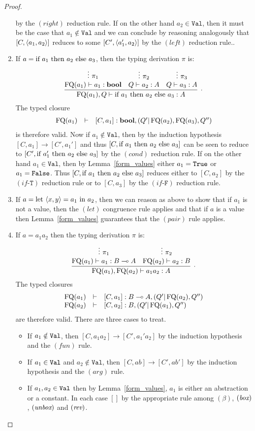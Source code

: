 \documentclass[twoside]{article}
\begin{document}
\begin{proof}
\begin{enumerate}
  by the $(right)$ reduction rule.
  If on the other hand $a_2\in\mathtt{Val}$, then it must be the case that $a_1\notin\mathtt{Val}$ 
  and we can conclude by reasoning analogously that $[C,\langle a_1,a_2\rangle]$ reduces to 
  some $[C',\langle a_1',a_2\rangle]$ by the $(left)$ reduction rule.. 
  \item If $a=\text{if}~ a_1 ~\text{then}~ a_2 ~\text{else}~ a_3$, then the typing derivation $\pi$ is:
  \[
  \infer[.]{\FQ(a_1),Q\entails \ifthenelse{a_1}{a_2}{a_3}:A}{
    \deduce[]{\FQ(a_1)\entails a_1:\bool }{
      \vdots~\pi_1
    }
    &
    \deduce[]{Q \entails a_2:A}{
      \vdots~\pi_2
    }    
    &
    \deduce[]{Q \entails a_3:A}{
      \vdots~\pi_3
    }    
  }
  \]  
  The typed closure
  \[
  \begin{array}{rcl}
  \mathop{\textrm{FQ}}\nolimits(a_1) & \vdash & [C,a_1]:\textrm{\bf bool},(Q'|\mathop{\textrm{FQ}}\nolimits(a_2),\mathop{\textrm{FQ}}\nolimits(a_3),Q'')
  \end{array}
  \]
  is therefore valid. Now if $a_1\notin\mathtt{Val}$, then by the induction hypothesis 
  $[C,a_1]\to[C',a_1']$ and thus $[C,\text{if}~ a_1 ~\text{then}~ a_2 ~\text{else}~ a_3]$ can
  be seen to reduce
  to $[C',\text{if}~ a_1' ~\text{then}~ a_2 ~\text{else}~ a_3]$ by the $(cond)$ reduction rule. 
  If on the other hand $a_1\in\mathtt{Val}$, then by 
  Lemma~\hyperref[form_values]{\ref*{form_values}} either $a_1=\texttt{True}$ or $a_1=\texttt{False}$. 
  Thus $[C,\text{if}~ a_1 ~\text{then}~ a_2 ~\text{else}~ a_3]$ reduces either to $[C,a_2]$ by the 
  $(if\mbox{-}\mathtt{T})$ reduction rule or 
  to $[C,a_3]$ by the $(if\mbox{-}\mathtt{F})$ reduction rule.
  \item If $a=\text{let}~ \langle x,y\rangle = a_1 ~\text{in}~ a_2$, then we can reason as above to show that 
  if $a_1$ is not a value, then the $(let)$ congruence rule applies and that if 
  $a$ is a value then Lemma~\hyperref[form_values]{\ref*{form_values}} 
  guarantees that the $(pair)$ rule applies.
  \item If $a=a_1a_2$ then the typing derivation $\pi$ is: 
  \[
    \infer[.]{\FQ(a_1),\FQ(a_2)\entails a_1a_2:A}{
      \deduce[]{\FQ(a_1)\entails a_1:B\loli A}{
        \vdots~\pi_1
      }
      &
      \deduce[]{\FQ(a_2)\entails a_2:B}{
        \vdots~\pi_2
      }      
    }
  \]  
  The typed closures
  \[
  \begin{array}{rcl}
  \mathop{\textrm{FQ}}\nolimits(a_1) & \vdash & [C,a_1]:B\multimap A,(Q'|\mathop{\textrm{FQ}}\nolimits(a_2),Q'')\\
  \mathop{\textrm{FQ}}\nolimits(a_2) & \vdash & [C,a_2]:B, (Q'|\mathop{\textrm{FQ}}\nolimits(a_1),Q'')
  \end{array}
  \]
  are therefore valid. There are three cases to treat.
  \begin{itemize}
    \item If $a_1\notin\texttt{Val}$, then $[C,a_1a_2]\to[C',a_1'a_2]$
    by the induction hypothesis and the $(fun)$ rule.
    \item If $a_1\in\texttt{Val}$ and $a_2\notin\mathtt{Val}$, then 
    $[C,ab]\to[C',ab']$ by the induction hypothesis and the $(arg)$ 
    rule.
    \item If $a_1,a_2\in\texttt{Val}$ then by 
    Lemma~\hyperref[form_values]{\ref*{form_values}}, $a_1$ is either 
    an abstraction or a constant. In each case $[]$ by the appropriate 
    rule among $(\beta)$, $(\mathop{\textit{box}}\nolimits)$, $(\mathop{\textit{unbox}}\nolimits)$ and $(\mathop{\textit{rev}}\nolimits)$. 
  \end{itemize}
\end{enumerate}
\end{proof}
\end{document}
